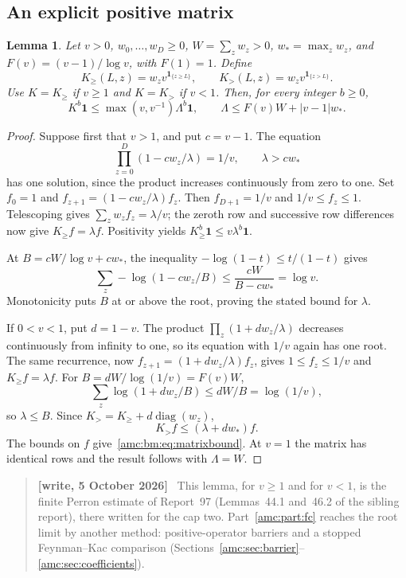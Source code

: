 \documentclass[11pt,letterpaper]{article}
\newtheorem{lemma}[theorem]{Lemma}
\theoremstyle{remark}\newtheorem{remark}[theorem]{Remark}
\newcommand{\ind}[1]{\mathbf1_{\{#1\}}}
\newenvironment{writenotedated}[1]{\par\smallskip\begin{quote}\small\textbf{[write, #1]}\ }{\end{quote}\smallskip}
\begin{document}
\subsection{An explicit positive matrix}
\begin{lemma}\label{amc:bm:lem:matrix}
Let $v>0$, $w_0,\ldots,w_D\ge0$, $W=\sum_z w_z>0$, $w_* =\max_z w_z$, and $F(v)=(v-1)/\log v$, with $F(1)=1$. Define
\[
 K_{\ge}(L,z)=w_zv^{\ind{z\ge L}},\qquad
 K_{>}(L,z)=w_zv^{\ind{z>L}}.
\]
Use $K=K_{\ge}$ if $v\ge1$ and $K=K_>$ if $v<1$. Then, for every integer $b\ge0$,
\begin{equation}\label{amc:bm:eq:matrixbound}
 K^b\boldsymbol1\le\max(v,v^{-1})\Lambda^b\boldsymbol1,
 \qquad \Lambda\le F(v)W+|v-1|w_*.
\end{equation}
\end{lemma}
\begin{proof}
Suppose first that $v>1$, and put $c=v-1$. The equation
\[
 \prod_{z=0}^D(1-cw_z/\lambda)=1/v,\qquad \lambda>cw_*
\]
has one solution, since the product increases continuously from zero to one. Set $f_0=1$ and $f_{z+1}=(1-cw_z/\lambda)f_z$. Then $f_{D+1}=1/v$ and $1/v\le f_z\le1$. Telescoping gives $\sum_z w_zf_z=\lambda/v$; the zeroth row and successive row differences now give $K_{\ge}f=\lambda f$. Positivity yields $K_{\ge}^b\boldsymbol1\le v\lambda^b\boldsymbol1$.

At $B=cW/\log v+cw_*$, the inequality $-\log(1-t)\le t/(1-t)$ gives
\[
 \sum_z-\log(1-cw_z/B)\le\frac{cW}{B-cw_*}=\log v.
\]
Monotonicity puts $B$ at or above the root, proving the stated bound for $\lambda$.

If $0<v<1$, put $d=1-v$. The product $\prod_z(1+dw_z/\lambda)$ decreases continuously from infinity to one, so its equation with $1/v$ again has one root. The same recurrence, now $f_{z+1}=(1+dw_z/\lambda)f_z$, gives $1\le f_z\le1/v$ and $K_{\ge}f=\lambda f$. For $B=dW/\log(1/v)=F(v)W$,
\[
 \sum_z\log(1+dw_z/B)\le dW/B=\log(1/v),
\]
so $\lambda\le B$. Since $K_>=K_{\ge}+d\operatorname{diag}(w_z)$,
\[
 K_>f\le(\lambda+dw_*)f.
\]
The bounds on $f$ give~\eqref{amc:bm:eq:matrixbound}. At $v=1$ the matrix has identical rows and the result follows with $\Lambda=W$.
\end{proof}

\begin{writenotedated}{5 October 2026}
This lemma, for $v\ge1$ and for $v<1$, is the finite Perron estimate of Report~97 (Lemmas~44.1 and~46.2 of the sibling report), there written for the cap two. Part~\ref{amc:part:fc} reaches the root limit by another method: positive-operator barriers and a stopped Feynman--Kac comparison (Sections~\ref{amc:sec:barrier}--\ref{amc:sec:coefficients}).
\end{writenotedated}
\end{document}
